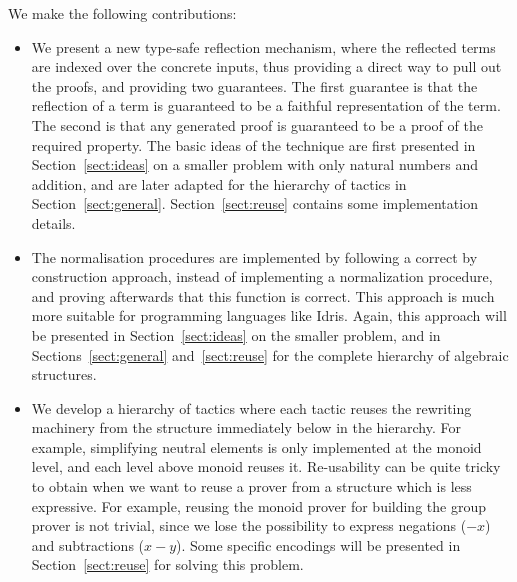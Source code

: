 We make the following contributions:

\begin{itemize}
        \item We present a new type-safe reflection mechanism, where the
        reflected terms are indexed over the concrete inputs, thus providing a
        direct way to pull out the proofs, and providing two guarantees.
        The first guarantee is that the reflection of a term is guaranteed to be a
        faithful representation of the term. The second is that any generated
        proof is guaranteed to be a proof of the required property. The basic
        ideas of the technique are first presented in Section~\ref{sect:ideas} on a
        smaller problem with only natural numbers and addition, and are later
        adapted for the hierarchy of tactics in Section~\ref{sect:general}. 
        Section~\ref{sect:reuse} contains some implementation details.	

        \item The normalisation procedures are implemented by following a
        correct by construction approach, instead of implementing a
        normalization procedure, and proving afterwards that this function
        is correct. This approach is much more suitable
        for programming languages like Idris. Again, this approach will be
        presented in Section~\ref{sect:ideas} on the smaller problem, 
        and in Sections~\ref{sect:general} and~\ref{sect:reuse}
        for the complete hierarchy of algebraic structures.

        \item We develop a hierarchy of tactics where each tactic reuses the
        rewriting machinery from the structure immediately below in the hierarchy.
        For example,
        simplifying neutral elements is only implemented at the monoid level,
        and each level above monoid reuses it. Re-usability can be quite tricky
        to obtain when we want to reuse a prover from a structure which is less
        expressive. For example, reusing the monoid prover for building the
        group prover is not trivial, since we lose the possibility to express
        negations ($-x$) and subtractions ($x-y$). Some specific encodings
        will be presented in Section~\ref{sect:reuse} for solving this problem.

\end{itemize}
